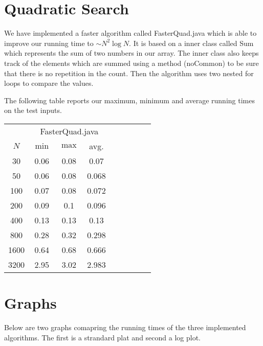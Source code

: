\documentclass{tufte-handout}
\begin{document}
\section{Quadratic Search}
We have implemented a faster algorithm called FasterQuad.java which is able to improve our running time to $\sim N^2\log N$. It is based on a inner class called Sum which represents the sum of two numbers in our array. The inner class also keeps track of the elements which are summed using a method (noCommon) to be sure that there is no repetition in the count. Then the algorithm uses two nested for loops to compare the values.

\bigskip

The following table reports our maximum, minimum and average running times on the test inputs.

\bigskip\noindent
{ \small
  \begin{tabular}{cccccccc}
  \toprule
& \multicolumn{3}{c}{FasterQuad.java} & $\quad$    \\\cmidrule{2-4} \cmidrule{6-8}
  $N$     & $\min$     & $\max$ & avg.  \\\midrule
  30 & 0.06 & 0.08 & 0.07 \\
  50 & 0.06 & 0.08 & 0.068 \\
  100 & 0.07 & 0.08 & 0.072 \\
  200 & 0.09 & 0.1 & 0.096 \\
  400 & 0.13 & 0.13 & 0.13 \\
  800 & 0.28 & 0.32 & 0.298 \\
  1600 & 0.64 & 0.68 & 0.666 \\
  3200 & 2.95 & 3.02 & 2.983 \\
  \bottomrule
  \end{tabular}
}

\newpage

\section{Graphs}
Below are two graphs comapring the running times of the three implemented algorithms. The first is a strandard plat and second a log plot.

\bigskip\noindent
\end{document}
